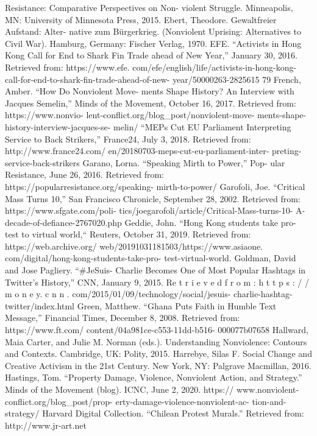 \documentclass[twoside,a4paper,12pt,fleqn,openany]{extbook}
\begin{document}
Resistance: Comparative Perspectives on Non-
violent Struggle. Minneapolis, MN: University of
Minnesota Press, 2015.
Ebert, Theodore. Gewaltfreier Aufstand: Alter-
native zum Bürgerkrieg. (Nonviolent Uprising:
Alternatives to Civil War). Hamburg, Germany:
Fischer Verlag, 1970.
EFE. “Activists in Hong Kong Call for End to
Shark Fin Trade ahead of New Year,” January
30, 2016. Retrieved from: https://www.efe.
com/efe/english/life/activists-in-hong-kong-
call-for-end-to-shark-fin-trade-ahead-of-new-
year/50000263-2825615
79
French, Amber. “How Do Nonviolent Move-
ments Shape History? An Interview with Jacques
Semelin,” Minds of the Movement, October 16,
2017. Retrieved from: https://www.nonvio-
lent-conflict.org/blog_post/nonviolent-move-
ments-shape-history-interview-jacques-se-
melin/
“MEPs Cut EU Parliament Interpreting Service
to Back Strikers,” France24, July 3, 2018.
Retrieved from: http://www.france24.com/
en/20180703-meps-cut-eu-parliament-inter-
preting-service-back-strikers
Garano, Lorna. “Speaking Mirth to Power,” Pop-
ular Resistance, June 26, 2016. Retrieved from:
https://popularresistance.org/speaking-
mirth-to-power/
Garofoli, Joe. “Critical Mass Turns 10,” San
Francisco Chronicle, September 28, 2002.
Retrieved from: https://www.sfgate.com/poli-
tics/joegarofoli/article/Critical-Mass-turns-10-
A-decade-of-defiance-2767020.php
Geddie, John. “Hong Kong students take pro-
test to virtual world,“ Reuters, October 31, 2019.
Retrieved from: https://web.archive.org/
web/20191031181503/https://www.asiaone.
com/digital/hong-kong-students-take-pro-
test-virtual-world.
Goldman, David and Jose Pagliery. “#JeSuis-
Charlie Becomes One of Most Popular Hashtags
in Twitter’s History,” CNN, January 9, 2015.
Re t r i e v e d f r o m : h t t p s : / / m o n e y. c n n .
com/2015/01/09/technology/social/jesuis-
charlie-hashtag-twitter/index.html
Green, Matthew. “Ghana Puts Faith in Humble
Text Message,” Financial Times, December 8,
2008. Retrieved from: https://www.ft.com/
content/04a981ce-c553-11dd-b516-
000077b07658
Hallward, Maia Carter, and Julie M. Norman
(eds.). Understanding Nonviolence: Contours
and Contexts. Cambridge, UK: Polity, 2015.
Harrebye, Silas F. Social Change and Creative
Activism in the 21st Century. New York, NY:
Palgrave Macmillan, 2016.
Hastings, Tom. “Property Damage, Violence,
Nonviolent Action, and Strategy.” Minds of the
Movement (blog). ICNC, June 2, 2020. https://
www.nonviolent-conflict.org/blog_post/prop-
erty-damage-violence-nonviolent-ac-
tion-and-strategy/
Harvard Digital Collection. “Chilean Protest
Murals.” Retrieved from: http://www.jr-art.net
\end{document}
